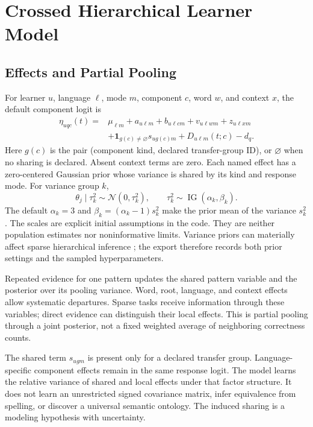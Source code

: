 \documentclass{article}
\begin{document}
\section{Crossed Hierarchical Learner Model}
\label{sec:model}

\subsection{Effects and Partial Pooling}

For learner \(u\), language \(\ell\), mode \(m\), component \(c\), word \(w\),
and context \(x\), the default component logit is
\begin{equation}
\begin{split}
\eta_{u q c}(t)={}&\mu_{\ell m}+a_{u\ell m}
 +b_{u\ell c m}+v_{u\ell w m}+z_{u\ell x m}\\
 &+\mathbf{1}_{g(c)\ne\varnothing}s_{u g(c)m}
 +D_{u\ell m}(t;c)-d_q .
\end{split}
\label{eq:eta}
\end{equation}
Here \(g(c)\) is the pair (component kind, declared transfer-group ID), or
\(\varnothing\) when no sharing is declared. Absent context terms are zero.
Each named effect has a zero-centered
Gaussian prior whose variance is shared by its kind and response mode.
For variance group \(k\),
\begin{equation}
 \theta_j\mid \tau_k^2\sim\mathcal N(0,\tau_k^2),\qquad
 \tau_k^2\sim\operatorname{IG}(\alpha_k,\beta_k).
\label{eq:hierarchy}
\end{equation}
The default \(\alpha_k=3\) and
\(\beta_k=(\alpha_k-1)s_k^2\) make the prior mean of the variance \(s_k^2\).
The scales are explicit initial assumptions in the code. They are neither
population estimates nor noninformative limits. Variance priors can materially
affect sparse hierarchical inference \citep{gelman2006prior}; the export
therefore records both prior settings and the sampled hyperparameters.

Repeated evidence for one pattern updates the shared pattern variable and
the posterior over its pooling variance. Word, root, language, and context
effects allow systematic departures. Sparse tasks receive information through
these variables; direct evidence can distinguish their local effects.
This is partial pooling through a joint posterior, not a fixed weighted
average of neighboring correctness counts.

The shared term \(s_{ugm}\) is present only for a declared transfer group.
Language-specific component effects remain in the same response logit.
The model learns the relative variance of shared and local effects under that
factor structure. It does not learn an unrestricted signed covariance matrix,
infer equivalence from spelling, or discover a universal semantic ontology.
The induced sharing is a modeling hypothesis with uncertainty.
\end{document}
